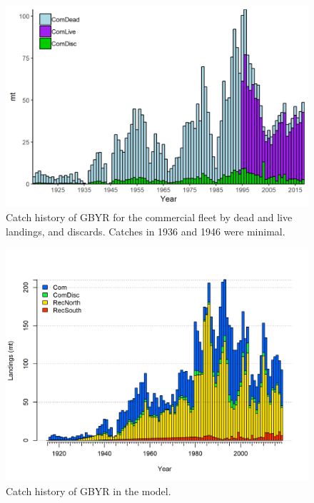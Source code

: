 \documentclass[12pt,]{article}
\begin{document}
\begin{figure}
\centering
\includegraphics{Figures/comm_exec.png}
\caption{Catch history of GBYR for the commercial fleet by dead and live
landings, and discards. Catches in 1936 and 1946 were minimal.
\label{fig:Exec_catch2}}
\end{figure}

\FloatBarrier

\begin{figure}
\centering
\includegraphics{r4ss/plots_mod1/catch2 landings stacked.png}
\caption{Catch history of GBYR in the model. \label{fig:r4ss_catches}}
\end{figure}
\end{document}
